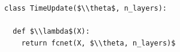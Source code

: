 \documentclass[border=10pt]{standalone}
\begin{document}
\begin{lstlisting}
class TimeUpdate($\\theta$, n_layers):

  def $\\lambda$(X):
    return fcnet(X, $\\theta, n_layers)$
\end{lstlisting}
\end{document}
